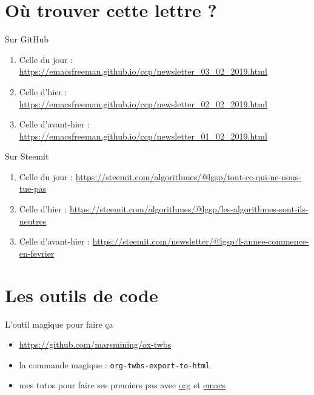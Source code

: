 \documentclass[presentation]{beamer}
\begin{document}
\section{Où trouver cette lettre ?}
\label{sec:orgae06452}
\begin{frame}[label={sec:orgc95f284}]{Sur GitHub}
\begin{enumerate}
\item Celle du jour :
\url{https://emacsfreeman.github.io/ccp/newsletter\_03\_02\_2019.html}

\item Celle d'hier :
\url{https://emacsfreeman.github.io/ccp/newsletter\_02\_02\_2019.html}

\item Celle d'avant-hier :
\url{https://emacsfreeman.github.io/ccp/newsletter\_01\_02\_2019.html}
\end{enumerate}
\end{frame}

\begin{frame}[label={sec:orgafd0c51}]{Sur Steemit}
\begin{enumerate}
\item Celle du jour :
\url{https://steemit.com/algorithmes/@lgsp/tout-ce-qui-ne-nous-tue-pas}

\item Celle d'hier :
\url{https://steemit.com/algorithmes/@lgsp/les-algorithmes-sont-ils-neutres}

\item Celle d'avant-hier :
\url{https://steemit.com/newsletter/@lgsp/l-annee-commence-en-fevrier}
\end{enumerate}
\end{frame}

\section{Les outils de code}
\label{sec:org9ce5477}
\begin{frame}[fragile,label={sec:orgea6e4fb}]{L'outil magique pour faire ça}
 \begin{itemize}
\item \url{https://github.com/marsmining/ox-twbs}
\item la commande magique : \texttt{org-twbs-export-to-html}
\item mes tutos pour faire ses premiers pas avec \href{https://www.youtube.com/playlist?list=PLUJNJAesbJGWi3dXmGljFTXCPt-ntQFco}{org} et \href{https://www.youtube.com/playlist?list=PLUJNJAesbJGXZHtC\_bTUOCwB\_qkfbdHpZ}{emacs}
\end{itemize}
\end{frame}
\end{document}
